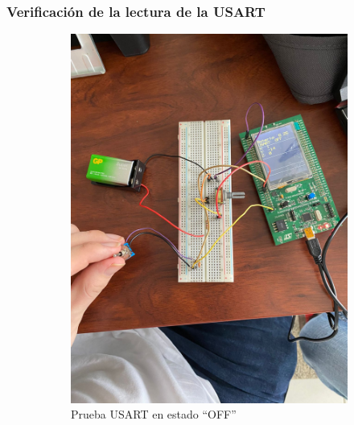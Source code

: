 \subsubsection{Verificación de la lectura de la USART}

\begin{figure}[H]
    \begin{subfigure}{0.5\textwidth}
    \centering
    \includegraphics[width=\textwidth]{Imagenes/Prueba_USART.jpg} 
    \caption{Prueba USART en estado ``OFF''}
    \label{Fig:Prueba_USART}
\end{subfigure}
\begin{subfigure}{0.5\textwidth}
    \centering

\end{subfigure}
\end{figure}
